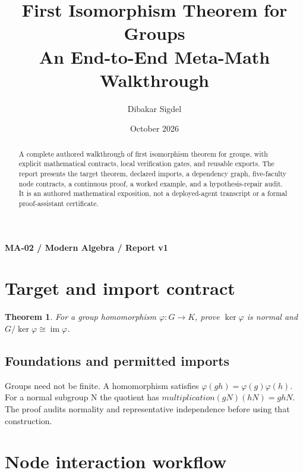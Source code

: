 \documentclass[preprint,12pt,aps,pra,showkeys,amsmath,amssymb,superscriptaddress,floatfix]{revtex4-2}
\newtheorem{theorem}{Theorem}[section]
\theoremstyle{definition}
\theoremstyle{remark}
\begin{document}
\title{First Isomorphism Theorem for Groups\\[4pt]\large An End-to-End Meta-Math Walkthrough}

\author{Dibakar Sigdel}


\date{October 2026}

\begin{abstract}

A complete authored walkthrough of first isomorphism theorem for groups,
with explicit mathematical contracts, local verification gates, and
reusable exports. The report presents the target theorem, declared
imports, a dependency graph, five-faculty node contracts, a continuous
proof, a worked example, and a hypothesis-repair audit. It is an
authored mathematical exposition, not a deployed-agent transcript or a
formal proof-assistant certificate.

\end{abstract}\maketitle\linespread{1.12}\selectfont

\noindent\textbf{MA-02 / Modern Algebra / Report v1}

\section{Target and import contract}

\begin{theorem}

For a group homomorphism \(\varphi:G\to K\), prove \(\ker\varphi\) is
normal and \(G/\ker\varphi\cong\operatorname{im}\varphi\).

\end{theorem}

\subsection{Foundations and permitted imports}

Groups need not be finite. A homomorphism satisfies
\(\varphi (gh)=\varphi (g)\varphi (h)\). For a normal subgroup N the
quotient has \(multiplication(gN)(hN)=ghN\). The proof audits normality
and representative independence before using that construction.

\clearpage\section{Node interaction workflow}
\end{document}
